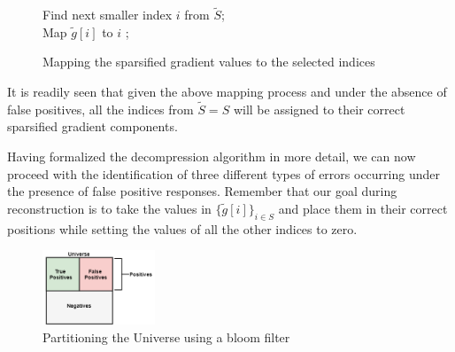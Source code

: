             \begin{figure}
            \centering
            \begin{minipage}{0.9\textwidth}
            \begin{algorithm}[H]
            	\SetAlgoLined
            \nl{}
            	{\nl  {}
            	{\nl Find next smaller index $i$ from $\tilde{S}$;\\
            	 \nl Map $\tilde{g}[i]$ to $i$ ;
            	}
             	}
             	\caption{Mapping the sparsified gradient values to the selected indices} \label{alg_4:mapping}
             \end{algorithm}
            \end{minipage}
            \end{figure}

            It is readily seen that given the above mapping process and under the absence of false positives, all the indices from $\tilde{S}=S$ will be assigned to their correct sparsified gradient components. 
            
            Having formalized the decompression algorithm in more detail, we can now proceed with the identification of three different types of errors occurring under the presence of false positive responses.
            Remember that our goal during reconstruction is to take the values in $\{\tilde{g}[i]\}_{i\in S}$ and place them in their correct positions 
            while setting the values of all the other indices to zero. 
  
            
            \begin{figure}[h]
            \centering
            \includegraphics[width=0.3\textwidth]{thesis/figures/bloom-universe.png}
            \caption{Partitioning the Universe using a bloom filter}
            \end{figure}
            
